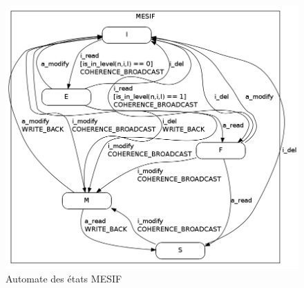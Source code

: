 \begin{figure}[!h]
\begin{center}
   \includegraphics[scale=0.5]{images/MESIF_simple.png}
   \caption{\label{img:state_mesif} Automate des états MESIF}
\end{center}
\end{figure}


